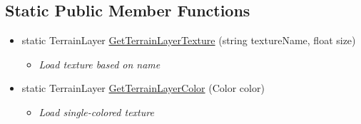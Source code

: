 \subsection*{Static Public Member Functions}
\begin{itemize}
\item[]  
static TerrainLayer \mbox{\hyperlink{classRacingGameBot_1_1Terrains_1_1TerrainGenerator_a091f7644a0b5abdaf5dffb6c8ce611e8}{GetTerrainLayerTexture}} (string textureName, float size)
\begin{itemize}\small\item[] \em Load texture based on name \end{itemize}\item[]  
static TerrainLayer \mbox{\hyperlink{classRacingGameBot_1_1Terrains_1_1TerrainGenerator_a5e614f0f16f169fdab412edc54de60ce}{GetTerrainLayerColor}} (Color color)
\begin{itemize}\small\item[] \em Load single-\/colored texture \end{itemize}\end{itemize}
